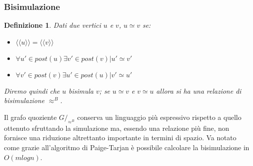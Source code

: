 \documentclass[12pt,a4paper,openright,twoside]{report}
\newtheorem{definition}{Definizione}
\theoremstyle{definition}
\begin{document}
\subsubsection{Bisimulazione}
\begin{definition}
Dati due vertici $u$ e $v$, $u \simeq v$ se:
\begin{itemize}
\item $\langle\langle u \rangle\rangle = \langle\langle v \rangle\rangle$
\item $\forall u' \in post(u) \exists v' \in post(v) | u' \simeq v'$
\item $\forall v' \in post(v) \exists u' \in post(u) | v' \simeq u'$
\end{itemize}
Diremo quindi che $u$ bisimula $v$; se $u \simeq v$ e $v \simeq u$ allora si ha una relazione di \emph{bisimulazione} $\approx^B$.
\end{definition}
Il grafo quoziente $G/_{\approx^B}$ conserva un linguaggio più espressivo rispetto a quello ottenuto sfruttando la simulazione ma, essendo una relazione più fine, non fornisce una riduzione altrettanto importante in termini di spazio. Va notato come grazie all'algoritmo di Paige-Tarjan è possibile calcolare la bisimulazione in $O(mlogn)$.
\end{document}
